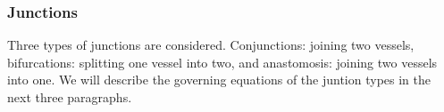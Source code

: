 \documentclass[a4paper, oneside]{discothesis}
\begin{document}

	\subsubsection{Junctions} \label{sssec:junctions}
	Three types of junctions are considered.
	Conjunctions: joining two vessels, bifurcations: splitting one vessel into two, and anastomosis: joining two vessels into one.
	We will describe the governing equations of the juntion types in the next three paragraphs. 
\end{document}

